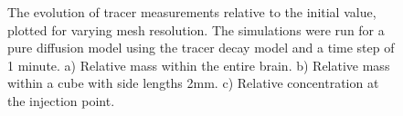 \documentclass[a4paper,11pt]{article} %
\newcommand{\1}{^{(1)}}
\newcommand{\2}{^{(2)}}
\providecommand{\DIFaddtex}[1]{{\protect\color{blue}\uwave{#1}}} %
\providecommand{\DIFdelbegin}{} %
\providecommand{\DIFaddFL}[1]{\DIFadd{#1}} %
\providecommand{\DIFaddbeginFL}{} %
\providecommand{\DIFaddendFL}{} %
\providecommand{\DIFdelendFL}{} %
\providecommand{\DIFadd}[1]{\texorpdfstring{\DIFaddtex{#1}}{#1}} %
\newcommand{\DIFscaledelfig}{0.5}
\newlength{\DIFdelgraphicswidth} %
\newlength{\DIFdelgraphicsheight} %
\newcommand{\DIFaddincludegraphics}[2][]{{\color{blue}\fbox{\DIFOincludegraphics[#1]{#2}}}} %
\newcommand{\DIFdelincludegraphics}[2][]{%
\sbox{\DIFdelgraphicsbox}{\DIFOincludegraphics[#1]{#2}}%
\settoboxwidth{\DIFdelgraphicswidth}{\DIFdelgraphicsbox} %
\settoboxtotalheight{\DIFdelgraphicsheight}{\DIFdelgraphicsbox} %
\scalebox{\DIFscaledelfig}{%
\parbox[b]{\DIFdelgraphicswidth}{\usebox{\DIFdelgraphicsbox}\\[-\baselineskip] \rule{\DIFdelgraphicswidth}{0em}}\llap{\resizebox{\DIFdelgraphicswidth}{\DIFdelgraphicsheight}{%
\setlength{\unitlength}{\DIFdelgraphicswidth}%
\begin{picture}(1,1)%
\thicklines\linethickness{2pt} %
{\color[rgb]{1,0,0}\put(0,0){\framebox(1,1){}}}%
{\color[rgb]{1,0,0}\put(0,0){\line( 1,1){1}}}%
{\color[rgb]{1,0,0}\put(0,1){\line(1,-1){1}}}%
\end{picture}%
}\hspace*{3pt}}} %
} %
\DeclareRobustCommand{\DIFdelbegin}{\DIFOdelbegin \let\includegraphics\DIFdelincludegraphics} %
\DeclareRobustCommand{\DIFaddbeginFL}{\DIFOaddbeginFL \let\includegraphics\DIFaddincludegraphics} %
\DeclareRobustCommand{\DIFaddendFL}{\DIFOaddendFL \let\includegraphics\DIFOincludegraphics} %
\DeclareRobustCommand{\DIFdelendFL}{\DIFOaddendFL \let\includegraphics\DIFOincludegraphics} %
\begin{document}
\DIFdelbegin %
\DIFdelendFL \DIFaddbeginFL \begin{figure}[hbt]
    \DIFaddendFL \centering
    \caption{The evolution of tracer measurements relative to the initial value, plotted for varying mesh resolution. The simulations were run for a pure diffusion model using the tracer decay model and a time step of 1 minute. a) Relative mass within the entire brain. b) Relative mass within a cube with side lengths \DIFaddbeginFL \DIFaddFL{of }\DIFaddendFL 2mm. c) Relative concentration at the injection point.}
    \label{fig: diffusion mesh resolution}
\end{figure}
\end{document}
